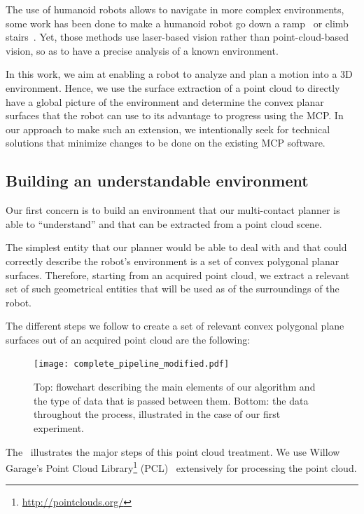 The use of humanoid robots allows to navigate in more complex environments, some work has been done to make a humanoid robot go down a ramp~\cite{lutz:iros:2012} or climb stairs~\cite{osswald:iros:2012}.
Yet, those methods use laser-based vision rather than point-cloud-based vision, so as to have a precise analysis of a known environment.

In this work, we aim at enabling a robot to analyze and plan a motion into a 3D environment.
Hence, we use the surface extraction of a point cloud to directly have a global picture of the environment and determine the convex planar surfaces that the robot can use to its advantage to progress using the MCP.\@
In our approach to make such an extension, we intentionally seek for technical solutions that minimize changes to be done on the existing MCP software.

\subsection{Building an understandable environment}
\label{sub:building_an_understandable_environment}

Our first concern is to build an environment that our multi-contact planner is able to ``understand'' and that can be extracted from a point cloud scene.

The simplest entity that our planner would be able to deal with and that could correctly describe the robot's environment is a set of convex polygonal planar surfaces.
Therefore, starting from an acquired point cloud, we extract a relevant set of such geometrical entities that will be used as of the surroundings of the robot.

The different steps we follow to create a set of relevant convex polygonal plane surfaces out of an acquired point cloud are the following:

\begin{figure}
\centering
  \texttt{[image: complete\_pipeline\_modified.pdf]}
  \caption{Top: flowchart describing the main elements of our algorithm and the type of data that is passed between them. Bottom: the data throughout the process, illustrated in the case of our first experiment.}
\label{fig:full_pipeline}
\end{figure}

The~ illustrates the major steps of this point cloud treatment.
We use Willow Garage's Point Cloud Library\footnote{\url{http://pointclouds.org/}} (PCL)~\cite{rusu:icra:2011} extensively for processing the point cloud.

